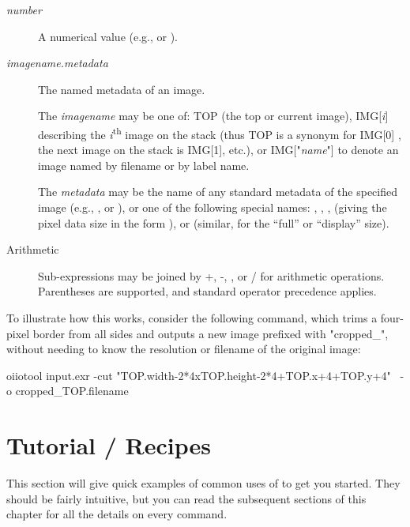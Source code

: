 \begin{description}
\item[{\emph{number}}]

A numerical value (e.g., {} or {}).

\item[{\emph{imagename.metadata}}]

The named metadata of an image.

The \emph{imagename} may be one of: {\cf TOP} (the top or current image),
{\cf IMG[}\emph{i}{\cf ]} describing the \emph{i}{\textsuperscript{th}} image
on the stack (thus {\cf TOP} is a synonym for {\cf IMG[0]} , the next image
on the stack is {\cf IMG[1]}, etc.), or {\cf IMG["}\emph{name}{\cf "]} to
denote an image named by filename or by label name.

The \emph{metadata} may be the name of any standard metadata of the
specified image (e.g., , or ), or one of
the following special names: , ,
,  (giving the pixel data size in the form
), or  (similar, for the ``full'' or
``display'' size).

\item[{Arithmetic}] Sub-expressions may be joined by {\cf +}, {\cf -},
{\cf *}, or {\cf /} for arithmetic operations. Parentheses are supported,
and standard operator precedence applies.
\end{description}

To illustrate how this works, consider the following command, which trims
a four-pixel border from all sides and outputs a new image prefixed with
"cropped_", without needing to know the resolution or filename of the
original image:

\begin{smallcode}
    oiiotool input.exr -cut "{TOP.width-2*4}x{TOP.height-2*4}+{TOP.x+4}+{TOP.y+4}" \
        -o cropped_{TOP.filename}
\end{smallcode}

\section{\oiiotool Tutorial / Recipes}

This section will give quick examples of common uses of \oiiotool to get
you started.  They should be fairly intuitive, but you can read the
subsequent sections of this chapter for all the details on every
command.

